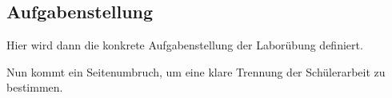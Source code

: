 \subsection{Aufgabenstellung}
Hier wird dann die konkrete Aufgabenstellung der Laborübung definiert.

Nun kommt ein Seitenumbruch, um eine klare Trennung der Schülerarbeit zu bestimmen.
\clearpage
